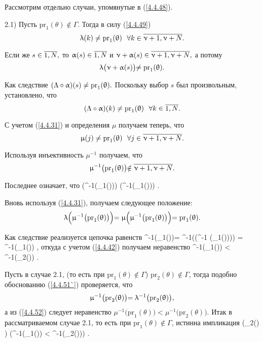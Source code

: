 Рассмотрим отдельно случаи, упомянутые в (\ref{4.4.48}).

2.1) Пусть $\mathrm{pr}_1(\theta) \notin \Gamma.$
Тогда в силу (\ref{4.4.49})
$$
  \la(k) \neq \mathrm{pr}_1(\theta)\ \ \fa k\in \ov{\nu+1,\nu+ N}
  .
$$

Если же $s\in \ov{1,N},$
то $\al(s) \in \ov{1,N}$
и $\nu +\al(s) \in \ov{\nu +1,\nu+N},$
а потому
$$
  \uplambda\bigl(\upnu +\upalpha(s)\bigl) \neq \mathrm{pr}_1(\uptheta)
  .
$$

Как следствие
$(\Lambda\circ \upalpha)(s) \neq \mathrm{pr}_1(\uptheta).$
Поскольку выбор $s$ был
произвольным, установлено, что
$$
  (\La \circ \al)(k) \neq \mathrm{pr}_1(\theta)\ \ \fa k\in \ov{1,N}
  .
$$

С учетом (\ref{4.4.31})
и определения $\mu$ получаем теперь, что
$$
  \mu(j) \neq \mathrm{pr}_1(\theta)\ \ \fa j\in \ov{\nu+1,\nu+N}
  .
$$

Используя инъективность $\mu^{-1}$ получаем, что
$$
  \mu^{-1}\bigl(\mathrm{pr}_1(\theta)\bigl)\notin \ov{\nu+1,\nu+N}
  .
$$

Последнее означает, что
\bfn
  \label{4.4.51}
  \Bigl(\mu^{-1}\bigl(_1(\theta)\bigl)\in {}\Bigl)  \vee
  \Bigl(\mu^{-1}\bigl(_1(\theta)\bigl)\in {}\Bigl)
  .
\efn

Вновь используя (\ref{4.4.31}),
получаем следующее положение:
$$
  \uplambda\Bigl(\upmu^{-1}\bigl(\mathrm{pr}_1(\uptheta)\bigl)\Bigl) = \upmu\Bigl(\upmu^{-1}\bigl(\mathrm{pr}_1(\uptheta)\bigl)\Bigl)= \mathrm{pr}_1(\uptheta)
  .
$$

Как следствие реализуется цепочка равенств
\bfn
  \label{4.4.51`}
  \mu^{-1}\bigl(_1(\theta)\bigl)= \la^{-1}\biggl(\la\Bigl(\mu^{-1}
  \bigl(_1(\theta)\bigl)\Bigl)\biggl) =
  \la^{-1}\bigl(_1(\theta)\bigl)
  ,
\efn
откуда с учетом (\ref{4.4.42})
получаем неравенство
\bfn
  \label{4.4.52}
  \mu^{-1}\bigl(_1(\theta)\bigl) < \la^{-1}\bigl(_2(\theta)\bigl)
  .
\efn

Пусть в случае 2.1,
(то есть при $\mathrm{pr}_1(\theta) \notin \Gamma$)
$\mathrm{pr}_2(\theta) \notin \Gamma$,
тогда подобно обоснованию (\ref{4.4.51`}) проверяется, что
$$
  \upmu^{-1}\bigl(\mathrm{pr}_2(\uptheta)\bigl) = \uplambda^{-1}\bigl(\mathrm{pr}_2(\uptheta)\bigl)
  ,
$$
а из (\ref{4.4.52})
следует неравенство
$\mu^{-1}\bigl(\mathrm{pr}_1(\theta)\bigl) <
\mu^{-1}\bigl(\mathrm{pr}_2(\theta)\bigl).$
Итак в рассматриваемом случае 2.1,
то есть при
$\mathrm{pr}_1(\theta) \notin \Gamma$,
истинна импликация
\bfn
  \label{4.4.53}
  \bigl(_2(\theta) \notin \Gamma) \Longrightarrow
  \Bigl(\mu^{-1}\bigl(_1(\theta)\bigl) <
  \mu^{-1}\bigl(_2(\theta)\bigl)\Bigl)
  .
\efn

